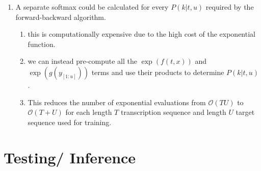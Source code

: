 \begin{enumerate}
    \item A separate softmax could be calculated for every $P(k|t, u)$ required by the forward-backward algorithm. 
    \hfill \cite{arxiv/1211.3711/Sequence-Transduction-RNN}
    \begin{enumerate}
        \item this is computationally expensive due to the high cost of the exponential function.
        \hfill \cite{arxiv/1211.3711/Sequence-Transduction-RNN}

        \item we can instead pre-compute all the $\exp (f (t, x))$ and $\exp(g(y_{[1:u]}))$ terms and use their products to determine $P(k|t, u)$. 
        \hfill \cite{arxiv/1211.3711/Sequence-Transduction-RNN}

        \item This reduces the number of exponential evaluations from $\mathcal{O}(T U )$ to $\mathcal{O}(T + U )$ for each length $T$ transcription sequence and length $U$ target sequence used for training.
        \hfill \cite{arxiv/1211.3711/Sequence-Transduction-RNN}
    \end{enumerate}
\end{enumerate}



\section{Testing/ Inference}

